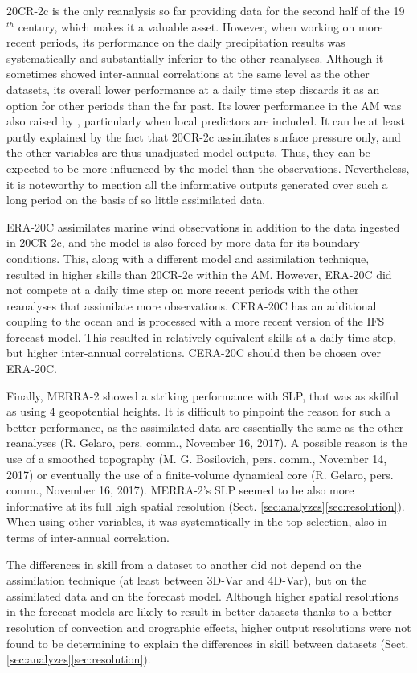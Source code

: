 \documentclass{ametsoc}
\begin{document}
20CR-2c is the only reanalysis so far providing data for the second half of the 19$^{th}$ century, which makes it a valuable asset. However, when working on more recent periods, its performance on the daily precipitation results was systematically and substantially inferior to the other reanalyses. Although it sometimes showed inter-annual correlations at the same level as the other datasets, its overall lower performance at a daily time step discards it as an option for other periods than the far past. Its lower performance in the AM was also raised by \citet[][]{Dayon2015}, particularly when local predictors are included. It can be at least partly explained by the fact that 20CR-2c assimilates surface pressure only, and the other variables are thus unadjusted model outputs. Thus, they can be expected to be more influenced by the model than the observations. Nevertheless, it is noteworthy to mention all the informative outputs generated over such a long period on the basis of so little assimilated data.

ERA-20C assimilates marine wind observations in addition to the data ingested in 20CR-2c, and the model is also forced by more data for its boundary conditions. This, along with a different model and assimilation technique, resulted in higher skills than 20CR-2c within the AM. However, ERA-20C did not compete at a daily time step on more recent periods with the other reanalyses that assimilate more observations. CERA-20C has an additional coupling to the ocean and is processed with a more recent version of the IFS forecast model. This resulted in relatively equivalent skills at a daily time step, but higher inter-annual correlations. CERA-20C should then be chosen over ERA-20C.

Finally, MERRA-2 showed a striking performance with SLP, that was as skilful as using 4 geopotential heights. It is difficult to pinpoint the reason for such a better performance, as the assimilated data are essentially the same as the other reanalyses (R. Gelaro, pers. comm., November 16, 2017). A possible reason is the use of a smoothed topography (M. G. Bosilovich, pers. comm., November 14, 2017) or eventually the use of a finite-volume dynamical core (R. Gelaro, pers. comm., November 16, 2017). MERRA-2's SLP seemed to be also more informative at its full high spatial resolution (Sect. \ref{sec:analyzes}\ref{sec:resolution}). When using other variables, it was systematically in the top selection, also in terms of inter-annual correlation.

The differences in skill from a dataset to another did not depend on the assimilation technique (at least between 3D-Var and 4D-Var), but on the assimilated data and on the forecast model. Although higher spatial resolutions in the forecast models are likely to result in better datasets thanks to a better resolution of convection and orographic effects, higher output resolutions were not found to be determining to explain the differences in skill between datasets (Sect. \ref{sec:analyzes}\ref{sec:resolution}). 
\end{document}
